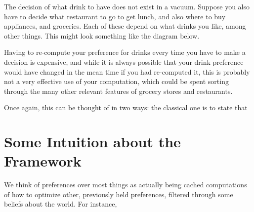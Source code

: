 \documentclass{article}
\begin{document}
	The decision of what drink to have does not exist in a vacuum. Suppose you also have to decide what restaurant to go to get lunch, and also where to buy appliances, and groceries. Each of these depend on what drinks you like, among other things. This might look something like the diagram below.
	\begin{center}
	\end{center}
	Having to re-compute your preference for drinks every time you have to make a decision is expensive, and while it is always possible that your drink preference would have changed in the mean time if you had re-computed it, this is probably not a very effective use of your computation, which could be spent sorting through the many other relevant features of grocery stores and restaurants. 
	
	Once again, this can be thought of in two ways: the classical one is to state that 
	

	\section{Some Intuition about the Framework}
	We think of preferences over most things as actually being cached computations of how to optimize other, previously held preferences, filtered through some beliefs about the world. For instance, 
	
\end{document}
